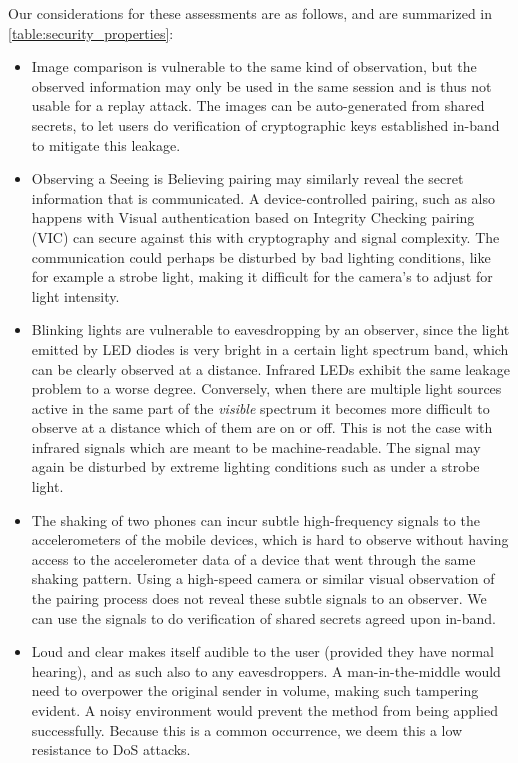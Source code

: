 \documentclass[conference, 11pt]{sty/IEEEtran}
\begin{document}
Our considerations for these assessments are as follows, and are summarized in \autoref{table:security_properties}:
\begin{itemize}
	\item Image comparison is vulnerable to the same kind of observation, but the observed information may only be used in the same session and is thus not usable for a replay attack.
	The images can be auto-generated from shared secrets, to let users do verification of cryptographic keys established in-band to mitigate this leakage.
	\item Observing a Seeing is Believing pairing may similarly reveal the secret information that is communicated. A device-controlled pairing, such as also happens with Visual authentication based on Integrity Checking pairing (VIC) can secure against this with cryptography and signal complexity.
	The communication could perhaps be disturbed by bad lighting conditions, like for example a strobe light, making it difficult for the camera's to adjust for light intensity.
	\item Blinking lights are vulnerable to eavesdropping by an observer, since the light emitted by LED diodes is very bright in a certain light spectrum band, which can be clearly observed at a distance.
	Infrared LEDs exhibit the same leakage problem to a worse degree.
	Conversely, when there are multiple light sources active in the same part of the \textit{visible} spectrum it becomes more difficult to observe at a distance which of them are on or off. This is not the case with infrared signals which are meant to be machine-readable.
	The signal may again be disturbed by extreme lighting conditions such as under a strobe light.
	\item The shaking of two phones can incur subtle high-frequency signals to the accelerometers of the mobile devices, which is hard to observe without having access to the accelerometer data of a device that went through the same shaking pattern.
	Using a high-speed camera or similar visual observation of the pairing process does not reveal these subtle signals to an observer.
	We can use the signals to do verification of shared secrets agreed upon in-band.
	\item Loud and clear makes itself audible to the user (provided they have normal hearing), and as such also to any eavesdroppers. A man-in-the-middle would need to overpower the original sender in volume, making such tampering evident. A noisy environment would prevent the method from being applied successfully. Because this is a common occurrence, we deem this a low resistance to DoS attacks.

\end{itemize}
\end{document}
